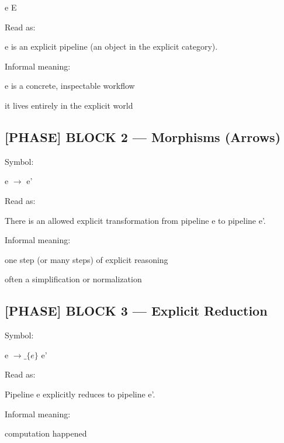 e E\par

Read as:\par

 e is an explicit pipeline (an object in the explicit category). \par

Informal meaning:\par

e is a concrete, inspectable workflow\par

it lives entirely in the explicit world\par

\subsection*{[PHASE] BLOCK 2 --- Morphisms (Arrows)}

Symbol:\par

e $\to$ e'\par

Read as:\par

 There is an allowed explicit transformation from pipeline e to pipeline e'. \par

Informal meaning:\par

one step (or many steps) of explicit reasoning\par

often a simplification or normalization\par

\subsection*{[PHASE] BLOCK 3 --- Explicit Reduction}

Symbol:\par

e $\to\_\{e\}$ e'\par

Read as:\par

 Pipeline e explicitly reduces to pipeline e'. \par

Informal meaning:\par

computation happened\par

